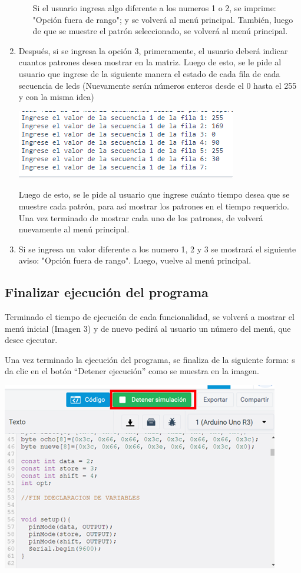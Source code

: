 \documentclass{article}
\begin{document}
\begin{enumerate}
\begin{itemize}
        Si el usuario ingresa algo diferente a los numeros 1 o 2, se imprime: "Opción fuera de rango"; y se volverá al menú principal. También, luego de que se muestre el patrón seleccionado, se volverá al menú principal. 
        
    \end{itemize}
    
    \item
    Después, si se ingresa la opción 3, primeramente, el usuario deberá indicar cuantos patrones desea mostrar en la matriz. Luego de esto, se le pide al usuario que ingrese de la siguiente manera el estado de cada fila de cada secuencia de leds (Nuevamente serán números enteros desde el 0 hasta el 255 y con la misma idea)
    
    \includegraphics[scale=0.7]{images/MuestraSecuencias.png}
    
    Luego de esto, se le pide al usuario que ingrese cuánto tiempo desea que se muestre cada patrón, para así mostrar los patrones en el tiempo requerido.
    \newline
    Una vez terminado de mostrar cada uno de los patrones, de volverá nuevamente al menú principal. 
    \item
    Si se ingresa un valor diferente a los numero 1, 2 y 3 se mostrará el siguiente aviso: "Opción fuera de rango". Luego, vuelve al menú principal. 
\end{enumerate}

\subsection{Finalizar ejecución del programa}
Terminado el tiempo de ejecución de cada funcionalidad, se volverá a mostrar el menú inicial (Imagen 3) y de nuevo pedirá al usuario un número del menú, que desee ejecutar.
\newline

Una vez terminado la ejecución del programa, se finaliza de la siguiente forma: s da clic en el botón “Detener ejecución” como se muestra en la imagen. 

\includegraphics[scale=0.8]{images/Finalizar.png}
\end{document}
